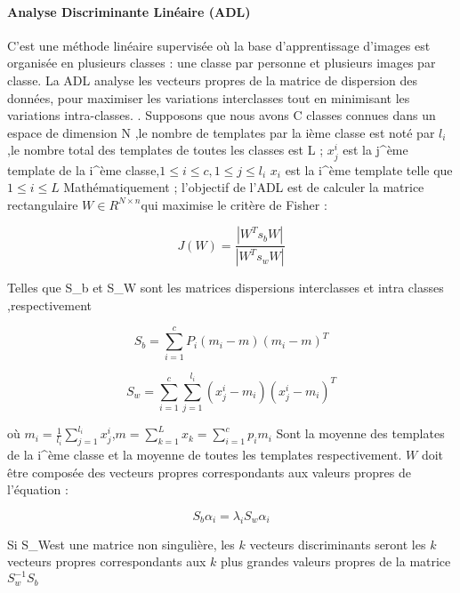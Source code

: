 \paragraph{Analyse Discriminante Linéaire (ADL)}
C’est une méthode linéaire supervisée où la base d’apprentissage d’images est organisée en plusieurs classes : une classe par personne et plusieurs images par classe. La ADL analyse les vecteurs propres de la matrice de dispersion des données, pour  maximiser les variations interclasses tout en minimisant les variations intra-classes. \citep{morizet2006revue}.
Supposons que nous avons C classes connues  dans un espace de dimension N ,le nombre de templates par la ième classe est noté par $l_{i}$ ,le nombre total des templates de toutes les classes est L ;
$x_j^i$ est la j^{ème} template de la i^{ème} classe,$1\leq i\leq c,1\leq j\leq l_{i}$
$x_{i}$  est la i^{ème} template telle que $1\leq i\leq L$
Mathématiquement ; l’objectif de l’ADL est de calculer la matrice rectangulaire $W\in R^{N\times n}$qui maximise le critère de Fisher :
	\begin{center}
	\begin{equation}\label{eq:chapitre3eq2}
J(W)=\frac{\left | W^Ts_b W \right |}{\left | W^Ts_w W\right |}
	\end{equation}
\end{center}
Telles que S_{b} et S_{W}  sont les matrices dispersions interclasses  et intra classes ,respectivement
\begin{center}
	\begin{equation}\label{eq:chapitre3eq2}
S_b=\sum_{i=1}^{c}P_i(m_i -m)(m_i-m)^T

	\end{equation}
\end{center}
\begin{center}
	\begin{equation}\label{eq:chapitre3eq2}
	S_w=\sum_{i=1}^{c}\sum_{j=1}^{l_{i}}(x_{j}^{i}-m_{i})(x_{j}^{i}-m_{i})^{T}
	
	\end{equation}
\end{center}
où $m_i=\frac{1}{l_i}\sum_{j=1}^{l_i}x_{j}^{i}$,$m=\sum_{k=1}^{L}x_{k}=\sum_{i=1}^{c}p_{i}m_{i}$ Sont la moyenne des templates de la i^{ème} classe et la moyenne de toutes les templates respectivement.
$W$ doit être composée des vecteurs propres correspondants aux valeurs propres de l’équation :
\begin{center}
	\begin{equation}\label{eq:chapitre3eq2}
	S_b \alpha _i=\lambda_i S_w \alpha_i
	
	\end{equation}
\end{center}
Si S_{W}est une matrice non singulière, les $k$ vecteurs discriminants seront les $k$ vecteurs propres correspondants aux $k$ plus grandes valeurs propres de la matrice $S_{w}^{-1}S_{b}$


